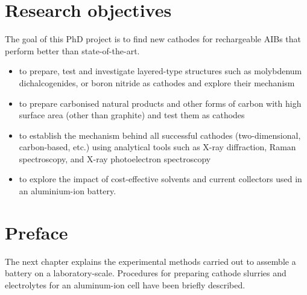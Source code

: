 \section{Research objectives}
The goal of this PhD project is to find new cathodes for rechargeable AIBs that perform better than state-of-the-art. 
\begin{itemize}

    \item to prepare, test and investigate layered-type structures such as molybdenum dichalcogenides, or boron nitride as cathodes and explore their mechanism
    \item to prepare carbonised natural products and other forms of carbon with high surface area (other than graphite) and test them as cathodes 
    \item to establish the mechanism behind all successful cathodes (two-dimensional, carbon-based, etc.) using analytical tools such as X-ray diffraction, Raman spectroscopy, and X-ray photoelectron spectroscopy
    \item to explore the impact of cost-effective solvents and current collectors used in an aluminium-ion battery. 
\end{itemize}
\newpage
\section*{\centering Preface}
The next chapter explains the experimental methods carried out to assemble a battery on a laboratory-scale. Procedures for preparing cathode slurries and electrolytes for an aluminum-ion cell have been briefly described.  





